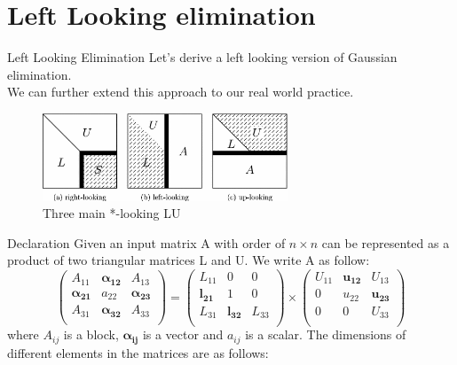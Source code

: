 \documentclass[9pt]{beamer}
\newcommand{\ccb}[1]{{\color{blue}#1}}
\begin{document}
	\section{Left Looking elimination}
	\begin{frame}{Left Looking Elimination}
		Let's derive a left looking version of Gaussian elimination.\\ \pause
		We can further extend this approach to our real world practice.\\ \pause\bigskip
		\begin{figure}[h]
			\centering
			\includegraphics[width=0.65\textwidth]{figures/left_LU.png}
			\caption{Three main *-looking LU}
		\end{figure}
	\end{frame}
	\begin{frame}{Declaration}
		Given an input matrix A with order of \ccb{$n\times n$} can be represented as a product of two triangular matrices L and U. We write A as follow:
		\[
			\left( \begin{array}{ccc} A_{11} & \pmb{\alpha_{12}}  & A_{13}\\ \pmb{\alpha_{21}} & a_{22}  & \pmb{\alpha_{23}}\\  A_{31} & \pmb{\alpha_{32}}  & A_{33}\\ \end{array} \right)  = \left( \begin{array}{ccc} L_{11} & 0  & 0\\ \pmb{l_{21}} & 1  & 0\\  L_{31} & \pmb{l_{32}}  & L_{33}\\ \end{array} \right) \times \left( \begin{array}{ccc} U_{11} & \pmb{u_{12}}  & U_{13}\\ 0 & u_{22}  & \pmb{u_{23}}\\  0 & 0  & U_{33}\\ \end{array} \right)
		\]
	where \ccb{$A_{ij}$} is a block, \ccb{$\pmb{\alpha_{ij}}$} is a vector and \ccb{$a_{ij}$} is a scalar. The dimensions of different elements in the matrices are as follows:
	\end{frame}
\end{document}

